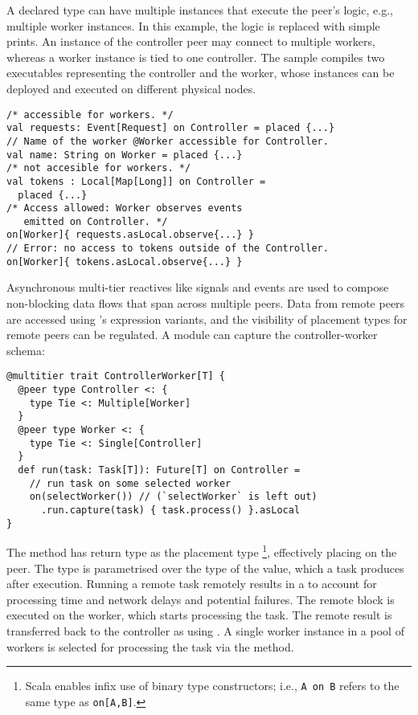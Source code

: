 A declared  type can have multiple instances that execute the peer's logic, e.g., multiple worker instances.
%
In this example, the logic is replaced with simple prints.
%
An instance of the controller peer may connect to multiple workers, whereas a worker instance is tied to one controller. 
%
The sample compiles two executables representing the controller and the worker, whose instances can be deployed and executed on different physical nodes.
\begin{verbatim}
/* accessible for workers. */
val requests: Event[Request] on Controller = placed {...}
// Name of the worker @Worker accessible for Controller.
val name: String on Worker = placed {...}
/* not accesible for workers. */
val tokens : Local[Map[Long]] on Controller = 
  placed {...}
/* Access allowed: Worker observes events 
   emitted on Controller. */
on[Worker]{ requests.asLocal.observe{...} }
// Error: no access to tokens outside of the Controller.
on[Worker]{ tokens.asLocal.observe{...} }
\end{verbatim}

Asynchronous multi-tier reactives like signals and events are used to compose non-blocking data flows that span across multiple peers. 
%
Data from remote peers are accessed using \scalaloci{}'s  expression variants,
and the visibility of placement types for remote peers can be regulated.
%
A  module can capture the controller-worker schema:

\begin{verbatim}
@multitier trait ControllerWorker[T] {
  @peer type Controller <: { 
    type Tie <: Multiple[Worker]
  }
  @peer type Worker <: { 
    type Tie <: Single[Controller] 
  }
  def run(task: Task[T]): Future[T] on Controller =
    // run task on some selected worker
    on(selectWorker()) // (`selectWorker` is left out) 
      .run.capture(task) { task.process() }.asLocal
}
\end{verbatim}
The  method has return type as the placement type \footnote{Scala enables infix use of binary type constructors;  i.e., \texttt{A on B} refers to the same type as \texttt{on[A,B]}.}, effectively placing  on the  peer. 
%
The  type is parametrised over the type  of the value, which a task produces after execution. 
%
Running a remote task remotely results in a  to account for processing time and network delays and potential failures. 
%
The remote block is executed on the worker, which starts processing the task. 
%
The remote result is transferred back to the controller as  using . 
%
A single worker instance in a pool of workers is selected for processing the task via the  method. 


